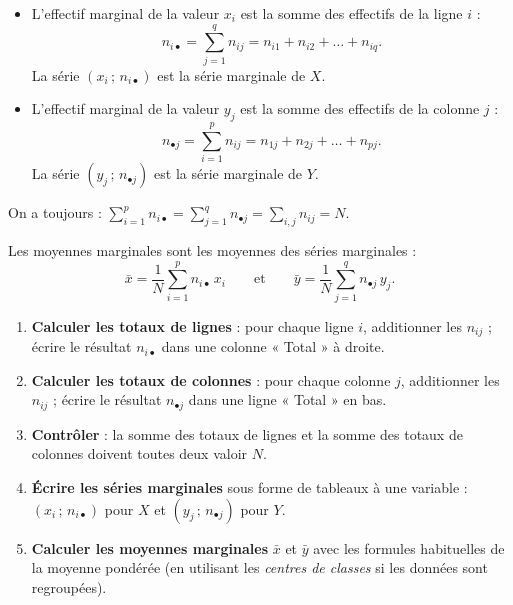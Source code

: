 \documentclass[11pt]{article}
\newcommand{\cle}[1]{{\popxbold\color{popdark}#1}}
\begin{document}
\begin{definition}
\begin{itemize}
\item L'\cle{effectif marginal} de la valeur $x_i$ est la somme des effectifs de la ligne $i$ :
\[ n_{i\bullet} = \sum_{j=1}^{q} n_{ij} = n_{i1} + n_{i2} + \dots + n_{iq}. \]
La série $(x_i\,;\,n_{i\bullet})$ est la \cle{série marginale de $X$}.
\item L'\cle{effectif marginal} de la valeur $y_j$ est la somme des effectifs de la colonne $j$ :
\[ n_{\bullet j} = \sum_{i=1}^{p} n_{ij} = n_{1j} + n_{2j} + \dots + n_{pj}. \]
La série $(y_j\,;\,n_{\bullet j})$ est la \cle{série marginale de $Y$}.
\end{itemize}
On a toujours : $\displaystyle \sum_{i=1}^{p} n_{i\bullet} = \sum_{j=1}^{q} n_{\bullet j} = \sum_{i,j} n_{ij} = N$.
\end{definition}

\begin{definition}
Les \cle{moyennes marginales} sont les moyennes des séries marginales :
\[ \bar{x} = \frac{1}{N}\sum_{i=1}^{p} n_{i\bullet}\, x_i \qquad \text{et} \qquad \bar{y} = \frac{1}{N}\sum_{j=1}^{q} n_{\bullet j}\, y_j. \]
\end{definition}

\begin{methode}
\begin{enumerate}
\item \textbf{Calculer les totaux de lignes} : pour chaque ligne $i$, additionner les $n_{ij}$ ; écrire le résultat $n_{i\bullet}$ dans une colonne « Total » à droite.
\item \textbf{Calculer les totaux de colonnes} : pour chaque colonne $j$, additionner les $n_{ij}$ ; écrire le résultat $n_{\bullet j}$ dans une ligne « Total » en bas.
\item \textbf{Contrôler} : la somme des totaux de lignes et la somme des totaux de colonnes doivent toutes deux valoir $N$.
\item \textbf{Écrire les séries marginales} sous forme de tableaux à une variable : $(x_i\,;\,n_{i\bullet})$ pour $X$ et $(y_j\,;\,n_{\bullet j})$ pour $Y$.
\item \textbf{Calculer les moyennes marginales} $\bar{x}$ et $\bar{y}$ avec les formules habituelles de la moyenne pondérée (en utilisant les \emph{centres de classes} si les données sont regroupées).
\end{enumerate}
\end{methode}
\end{document}
